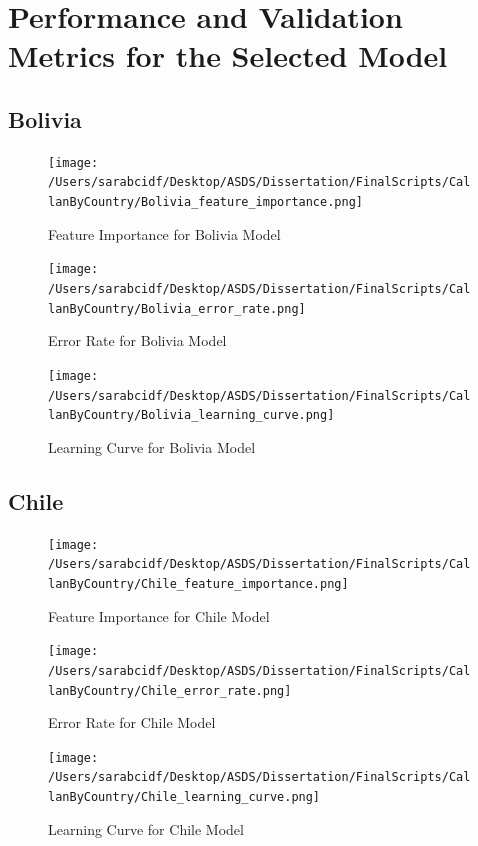 \documentclass[12pt,letterpaper]{article}
\begin{document}
	\newpage
	\section{Performance and Validation Metrics for the Selected Model}
	
	\subsection{Bolivia}
	\begin{figure}[H]
		\centering
		\caption{Feature Importance for Bolivia Model}
		\texttt{[image: /Users/sarabcidf/Desktop/ASDS/Dissertation/FinalScripts/CallanByCountry/Bolivia\_feature\_importance.png]}
	\end{figure}
	\begin{figure}[H]
		\centering
		\caption{Error Rate for Bolivia Model}
		\texttt{[image: /Users/sarabcidf/Desktop/ASDS/Dissertation/FinalScripts/CallanByCountry/Bolivia\_error\_rate.png]}
	\end{figure}
	\begin{figure}[H]
		\centering
		\caption{Learning Curve for Bolivia Model}
		\texttt{[image: /Users/sarabcidf/Desktop/ASDS/Dissertation/FinalScripts/CallanByCountry/Bolivia\_learning\_curve.png]}
	\end{figure}
	
	\newpage
	
	\subsection{Chile}
	\begin{figure}[H]
		\centering
		\caption{Feature Importance for Chile Model}
		\texttt{[image: /Users/sarabcidf/Desktop/ASDS/Dissertation/FinalScripts/CallanByCountry/Chile\_feature\_importance.png]}
	\end{figure}
	\begin{figure}[H]
		\centering
		\caption{Error Rate for Chile Model}
		\texttt{[image: /Users/sarabcidf/Desktop/ASDS/Dissertation/FinalScripts/CallanByCountry/Chile\_error\_rate.png]}
	\end{figure}
	\begin{figure}[H]
		\centering
		\caption{Learning Curve for Chile Model}
		\texttt{[image: /Users/sarabcidf/Desktop/ASDS/Dissertation/FinalScripts/CallanByCountry/Chile\_learning\_curve.png]}
	\end{figure}
	
	\newpage
	
\end{document}
